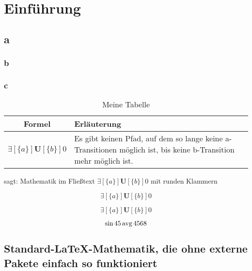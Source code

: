 \chapter{Einführung}

\section{a}
\subsection{b}
\subsection{c}

\blindtext[5]


\blindtext[5]

\blindtext[5]

\blindtext[5]

\begin{table}[ht]
\begin{center}
\begin{tabular}{cp{}} \toprule
\textbf{Formel} & \textbf{Erläuterung} \\ \midrule
\( \exists[\{a\}]\mathbf{U} [\{b\}]0 \) & Es gibt keinen Pfad, auf dem so lange keine a-Transitionen möglich ist, bis keine b-Transition mehr möglich ist.\\
\end{tabular}
\end{center}
\caption{Meine Tabelle}\label{tab:meine}
\end{table}

 sagt: 
Mathematik im Fließtext \( \exists[\{a\}]\mathbf{U} [\{b\}]0 \)  mit runden Klammern 

\[ \exists[\{a\}]\mathbf{U} [\{b\}]0 \]

\begin{equation}
\exists[\{a\}]\mathbf{U} [\{b\}]0
\end{equation}

\begin{equation}
\sin 45 \avg 4568
\end{equation}

\section[Standard-\LaTeX-Mathematik]{Standard-\LaTeX-Mathematik, die ohne externe Pakete einfach so funktioniert}

